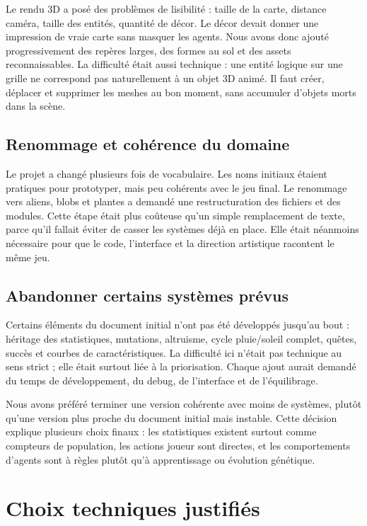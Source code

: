 ﻿\documentclass[11pt,a4paper]{article}
\begin{document}
Le rendu 3D a posé des problèmes de lisibilité : taille de la carte, distance caméra, taille des entités, quantité de décor. Le décor devait donner une impression de vraie carte sans masquer les agents. Nous avons donc ajouté progressivement des repères larges, des formes au sol et des assets reconnaissables. La difficulté était aussi technique : une entité logique sur une grille ne correspond pas naturellement à un objet 3D animé. Il faut créer, déplacer et supprimer les meshes au bon moment, sans accumuler d'objets morts dans la scène.

\subsection{Renommage et cohérence du domaine}

Le projet a changé plusieurs fois de vocabulaire. Les noms initiaux étaient pratiques pour prototyper, mais peu cohérents avec le jeu final. Le renommage vers aliens, blobs et plantes a demandé une restructuration des fichiers et des modules. Cette étape était plus coûteuse qu'un simple remplacement de texte, parce qu'il fallait éviter de casser les systèmes déjà en place. Elle était néanmoins nécessaire pour que le code, l'interface et la direction artistique racontent le même jeu.

\subsection{Abandonner certains systèmes prévus}

Certains éléments du document initial n'ont pas été développés jusqu'au bout : héritage des statistiques, mutations, altruisme, cycle pluie/soleil complet, quêtes, succès et courbes de caractéristiques. La difficulté ici n'était pas technique au sens strict ; elle était surtout liée à la priorisation. Chaque ajout aurait demandé du temps de développement, du debug, de l'interface et de l'équilibrage.

Nous avons préféré terminer une version cohérente avec moins de systèmes, plutôt qu'une version plus proche du document initial mais instable. Cette décision explique plusieurs choix finaux : les statistiques existent surtout comme compteurs de population, les actions joueur sont directes, et les comportements d'agents sont à règles plutôt qu'à apprentissage ou évolution génétique.

\section{Choix techniques justifiés}
\end{document}

